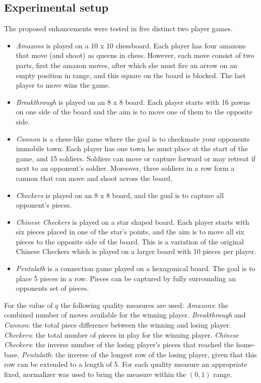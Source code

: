 \documentclass{ecai2014}
\begin{document}
\subsection{Experimental setup}
\label{subsec:expsetup}
The proposed enhancements were tested in five distinct two player games.
\begin{itemize}
\item \emph{Amazons} is played on a 10 x 10 chessboard. Each player has four amazons that move (and shoot) as queens in chess. However, each move consist of two parts, first the amazon moves, after which she must fire an arrow on an empty position in range, and this square on the board is blocked. The last player to move wins the game.
\item \emph{Breakthrough} is played on an 8 x 8 board. Each player starts with 16 pawns on one side of the board and the aim is to move one of them to the opposite side.
\item \emph{Cannon} is a chess-like game where the goal is to checkmate your opponents immobile town. Each player has one town he must place at the start of the game, and 15 soldiers. Soldiers can move or capture forward or may retreat if next to an opponent's soldier. Moreover, three soldiers in a row form a cannon that can move and shoot across the board.
\item \emph{Checkers} is played on an 8 x 8 board, and the goal is to capture all opponent's pieces.
\item \emph{Chinese Checkers} is played on a star shaped board. Each player starts with six pieces placed in one of the star's points, and the aim is to move all six pieces to the opposite side of the board. This is a variation of the original Chinese Checkers which is played on a larger board with 10 pieces per player.
\item \emph{Pentalath} is a connection game played on a hexagonical board. The goal is to place 5 pieces in a row. Pieces can be captured by fully surrounding an opponents set of pieces.
\end{itemize}
For the value of $q$ the following quality measures are used: \emph{Amazons}: the combined number of moves available for the winning player. \emph{Breakthrough} and \emph{Cannon}: the total piece difference between the winning and losing player. \emph{Checkers}: the total number of pieces in play for the winning player. \emph{Chinese Checkers}: the inverse number of the losing player's pieces that reached the home-base. \emph{Pentalath}: the inverse of the longest row of the losing player, given that this row can be extended to a length of 5.
For each quality measure an appropriate fixed, normalizer was used to bring the measure within the $(0,1)$ range.
\end{document}
